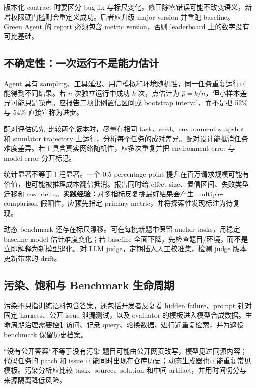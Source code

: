 \documentclass[a4paper]{article}
\begin{document}
版本化 contract 时要区分 bug fix 与标尺变化。修正除零错误可能不改变语义，新增权限硬门槛则会重定义成功。后者应升级 major version 并重跑 baseline。Green Agent 的 report 必须包含 metric version，否则 leaderboard 上的数字没有可比基础。

\subsection{不确定性：一次运行不是能力估计}

Agent 具有 sampling、工具延迟、用户模拟和环境随机性，同一任务重复运行可能得到不同结果。若 $n$ 次独立运行中成功 $k$ 次，点估计为 $\hat p=k/n$，但小样本差异可能只是噪声。应报告二项比例置信区间或 bootstrap interval，而不是把 52\% 与 54\% 直接宣称为进步。

\begin{knowledgebox}{配对评估优先}
比较两个版本时，尽量在相同 task、seed、environment snapshot 和 simulator trajectory 上运行，分析每个任务的成对差异。配对设计能抵消任务难度差异。若工具含真实网络随机性，应多次重复并把 environment error 与 model error 分开标记。
\end{knowledgebox}

统计显著不等于工程显著。一个 0.5 percentage point 提升在百万请求规模可能有价值，也可能被推理成本翻倍抵消。报告同时给 effect size、置信区间、失败类型迁移和 cost delta。\textbf{实践经验：}对多指标反复挑最好结果会产生 multiple-comparison 假阳性，应预先指定 primary metric，并将探索性发现标注为待复现。

动态 benchmark 还存在标尺漂移。可在每批新题中保留 anchor tasks，用稳定 baseline model 估计难度变化；若 baseline 全面下降，先检查题目/环境，而不是立即解释为新模型退化。对 LLM judge，定期插入人工校准集，检测 judge 版本更新带来的 drift。

\subsection{污染、饱和与 Benchmark 生命周期}

污染不只指训练语料包含答案，还包括开发者反复看 hidden failure、prompt 针对固定 harness、公开 issue 泄漏测试，以及 evaluator 的模板进入模型合成数据。生命周期治理需要控制访问、记录 query、轮换数据、进行近重复检索，并为退役 benchmark 保留历史档案。

\begin{warningbox}{“没有公开答案”不等于没有污染}
题目可能由公开网页改写，模型见过同源内容；代码任务的 patch 和 issue 可能同时出现在仓库历史；动态生成器也可能重复常见模板。污染分析应比较 task、source、solution 和中间 artifact，并用时间切分与来源隔离降低风险。
\end{warningbox}
\end{document}
